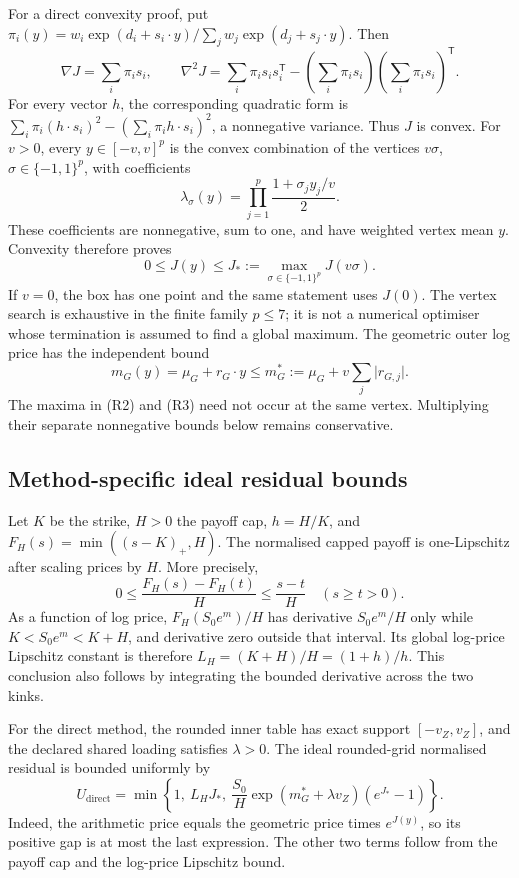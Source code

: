 For a direct convexity proof, put
\(\pi_i(y)=w_i\exp(d_i+s_i\cdot y)/\sum_jw_j\exp(d_j+s_j\cdot y)\).
Then
\[
 \nabla J=\sum_i\pi_i s_i,\qquad
 \nabla^2J=\sum_i\pi_i s_i s_i^{\mathsf T}
             -\left(\sum_i\pi_i s_i\right)
              \left(\sum_i\pi_i s_i\right)^{\mathsf T}.
\]
For every vector \(h\), the corresponding quadratic form is
\(\sum_i\pi_i(h\cdot s_i)^2-(\sum_i\pi_i h\cdot s_i)^2\),
a nonnegative variance. Thus \(J\) is convex. For \(v>0\), every
\(y\in[-v,v]^p\) is the convex combination of the vertices
\(v\sigma\), \(\sigma\in\{-1,1\}^p\), with coefficients
\[
 \lambda_\sigma(y)=\prod_{j=1}^p\frac{1+\sigma_j y_j/v}{2}.
\]
These coefficients are nonnegative, sum to one, and have weighted vertex
mean \(y\). Convexity therefore proves
\[
 0\leq J(y)\leq
 J_*:=\max_{\sigma\in\{-1,1\}^p}J(v\sigma).               \tag{R2}
\]
If \(v=0\), the box has one point and the same statement uses \(J(0)\).
The vertex search is exhaustive in the finite family \(p\leq7\);
it is not a numerical optimiser whose termination is assumed to find a
global maximum. The geometric outer log price has the independent bound
\[
 m_G(y)=\mu_G+r_G\cdot y
       \leq m_G^*:=\mu_G+v\sum_j\lvert r_{G,j}\rvert.        \tag{R3}
\]
The maxima in (R2) and (R3) need not occur at the same vertex. Multiplying
their separate nonnegative bounds below remains conservative.

\subsection{Method-specific ideal residual bounds}

Let \(K\) be the strike, \(H>0\) the payoff cap, \(h=H/K\), and
\(F_H(s)=\min((s-K)_+,H)\). The normalised capped payoff is one-Lipschitz
after scaling prices by \(H\). More precisely,
\[
 0\leq\frac{F_H(s)-F_H(t)}{H}\leq\frac{s-t}{H}
 \quad(s\geq t>0).
\]
As a function of log price, \(F_H(S_0e^m)/H\) has derivative
\(S_0e^m/H\) only while \(K<S_0e^m<K+H\), and derivative zero
outside that interval. Its global log-price Lipschitz constant is therefore
\(L_H=(K+H)/H=(1+h)/h\). This conclusion also follows by integrating
the bounded derivative across the two kinks.

For the direct method, the rounded inner table has exact support
\([-v_Z,v_Z]\), and the declared shared loading satisfies \(\lambda>0\).
The ideal rounded-grid normalised residual is bounded uniformly by
\[
 U_{\mathrm{direct}}=
 \min\left\{1,\ L_HJ_*,\
  \frac{S_0}{H}\exp(m_G^*+\lambda v_Z)(e^{J_*}-1)\right\}.   \tag{R4}
\]
Indeed, the arithmetic price equals the geometric price times \(e^{J(y)}\),
so its positive gap is at most the last expression. The other two terms
follow from the payoff cap and the log-price Lipschitz bound.

